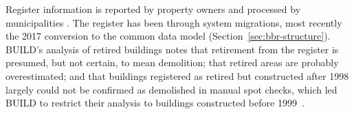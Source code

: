 Register information is reported by property owners and processed by
municipalities . The register
has been through system migrations, most recently the 2017 conversion to
the common data model (Section~\ref{sec:bbr-structure}). BUILD's
analysis of retired buildings notes that retirement from the register is
presumed, but not certain, to mean demolition; that retired areas are
probably overestimated; and that buildings registered as retired but
constructed after 1998 largely could not be confirmed as demolished in
manual spot checks, which led BUILD to restrict their analysis to
buildings constructed before 1999~\cite{jensen2025nedrivning}.
